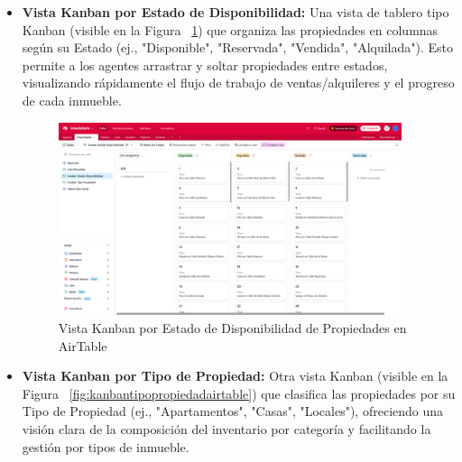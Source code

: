 \begin{enumerate}
\begin{itemize}
        \item \textbf{Vista Kanban por Estado de Disponibilidad:} Una vista de tablero tipo Kanban (visible en la Figura ~\ref{fig:kanbanestadodisponibilidadpropiedadairtable}) que organiza las propiedades en columnas según su Estado (ej., "Disponible", "Reservada", "Vendida", "Alquilada"). Esto permite a los agentes arrastrar y soltar propiedades entre estados, visualizando rápidamente el flujo de trabajo de ventas/alquileres y el progreso de cada inmueble.
    
        \begin{figure}[H]
            \begin{center}
                \includegraphics[width = 0.95\textwidth]{Figuras/kanbanestadodisponibilidadpropiedadairtable.png}
            \end{center}
            \caption{\label{fig:kanbanestadodisponibilidadpropiedadairtable} Vista Kanban por Estado de Disponibilidad de Propiedades en AirTable}
        \end{figure}

         \item \textbf{Vista Kanban por Tipo de Propiedad:} Otra vista Kanban (visible en la Figura ~\ref{fig:kanbantipopropiedadairtable}) que clasifica las propiedades por su Tipo de Propiedad (ej., "Apartamentos", "Casas", "Locales"), ofreciendo una visión clara de la composición del inventario por categoría y facilitando la gestión por tipos de inmueble.


\end{itemize}
\end{enumerate}
